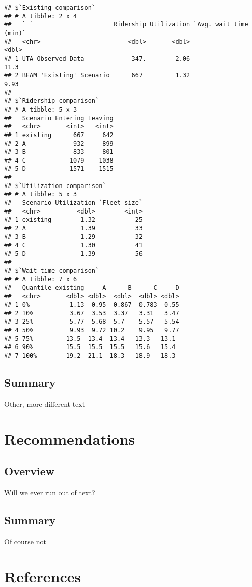 \documentclass[
]{article}
\begin{document}
\begin{verbatim}
## $`Existing comparison`
## # A tibble: 2 x 4
##   ` `                      Ridership Utilization `Avg. wait time (min)`
##   <chr>                        <dbl>       <dbl>                  <dbl>
## 1 UTA Observed Data             347.        2.06                  11.3 
## 2 BEAM 'Existing' Scenario      667         1.32                   9.93
## 
## $`Ridership comparison`
## # A tibble: 5 x 3
##   Scenario Entering Leaving
##   <chr>       <int>   <int>
## 1 existing      667     642
## 2 A             932     899
## 3 B             833     801
## 4 C            1079    1038
## 5 D            1571    1515
## 
## $`Utilization comparison`
## # A tibble: 5 x 3
##   Scenario Utilization `Fleet size`
##   <chr>          <dbl>        <int>
## 1 existing        1.32           25
## 2 A               1.39           33
## 3 B               1.29           32
## 4 C               1.30           41
## 5 D               1.39           56
## 
## $`Wait time comparison`
## # A tibble: 7 x 6
##   Quantile existing     A      B      C     D
##   <chr>       <dbl> <dbl>  <dbl>  <dbl> <dbl>
## 1 0%           1.13  0.95  0.867  0.783  0.55
## 2 10%          3.67  3.53  3.37   3.31   3.47
## 3 25%          5.77  5.68  5.7    5.57   5.54
## 4 50%          9.93  9.72 10.2    9.95   9.77
## 5 75%         13.5  13.4  13.4   13.3   13.1 
## 6 90%         15.5  15.5  15.5   15.6   15.4 
## 7 100%        19.2  21.1  18.3   18.9   18.3
\end{verbatim}

\hypertarget{summary-3}{%
\subsection{Summary}\label{summary-3}}

Other, more different text

\hypertarget{recommendations}{%
\section{Recommendations}\label{recommendations}}

\hypertarget{overview-4}{%
\subsection{Overview}\label{overview-4}}

Will we ever run out of text?

\hypertarget{summary-4}{%
\subsection{Summary}\label{summary-4}}

Of course not

\hypertarget{references}{%
\section*{References}\label{references}}
\end{document}
